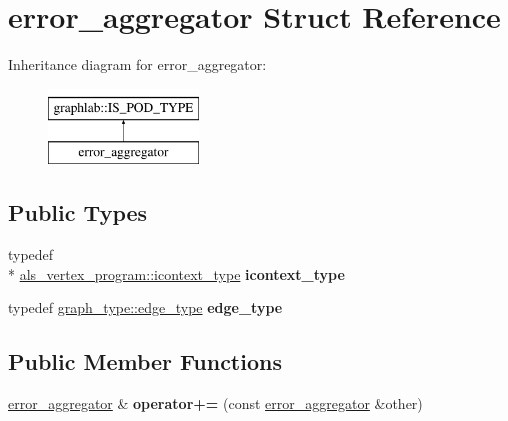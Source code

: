 \hypertarget{structerror__aggregator}{\section{error\-\_\-aggregator Struct Reference}
\label{structerror__aggregator}
}
Inheritance diagram for error\-\_\-aggregator\-:\begin{figure}[H]
\begin{center}
\leavevmode
\includegraphics[height=2.000000cm]{structerror__aggregator}
\end{center}
\end{figure}
\subsection*{Public Types}
\begin{DoxyCompactItemize}
\item 
\hypertarget{structerror__aggregator_a640e7ca473b36d7968fecc82de107c12}{typedef \\*
\hyperlink{classgraphlab_1_1icontext}{als\-\_\-vertex\-\_\-program\-::icontext\-\_\-type} {\bfseries icontext\-\_\-type}}\label{structerror__aggregator_a640e7ca473b36d7968fecc82de107c12}

\item 
\hypertarget{structerror__aggregator_a4f190a0998b5796c2a69ec563492b66a}{typedef \hyperlink{structgraphlab_1_1_graph_lab_edge_wrapper}{graph\-\_\-type\-::edge\-\_\-type} {\bfseries edge\-\_\-type}}\label{structerror__aggregator_a4f190a0998b5796c2a69ec563492b66a}

\end{DoxyCompactItemize}
\subsection*{Public Member Functions}
\begin{DoxyCompactItemize}
\item 
\hypertarget{structerror__aggregator_abe0144adcf2c91ffb6d0580e38be9f62}{\hyperlink{structerror__aggregator}{error\-\_\-aggregator} \& {\bfseries operator+=} (const \hyperlink{structerror__aggregator}{error\-\_\-aggregator} \&other)}\label{structerror__aggregator_abe0144adcf2c91ffb6d0580e38be9f62}

\end{DoxyCompactItemize}
